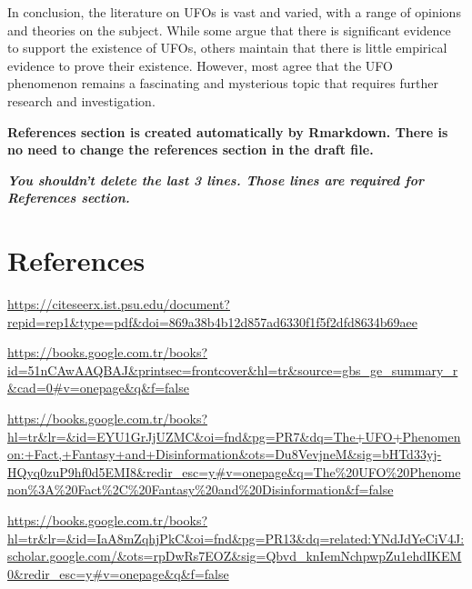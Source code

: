 \documentclass[
]{article}
\newlength{\cslhangindent}
\newlength{\cslentryspacingunit} %
\newenvironment{CSLReferences}[2] %
 {%
  \setlength{\parindent}{0pt}
  \ifodd #1
  \let\oldpar\par
  \def\par{\hangindent=\cslhangindent\oldpar}
  \fi
  \setlength{\parskip}{#2\cslentryspacingunit}
 }%
 {}
\begin{document}
In conclusion, the literature on UFOs is vast and varied, with a range of opinions and theories on the subject. While some argue that there is significant evidence to support the existence of UFOs, others maintain that there is little empirical evidence to prove their existence. However, most agree that the UFO phenomenon remains a fascinating and mysterious topic that requires further research and investigation.

\textbf{References section is created automatically by Rmarkdown. There is no need to change the references section in the draft file.}

\textbf{\emph{You shouldn't delete the last 3 lines. Those lines are required for References section.}}

\newpage

\hypertarget{references}{%
\section{References}\label{references}}

\hypertarget{refs}{}
\begin{CSLReferences}{0}{0}
\end{CSLReferences}

\url{https://citeseerx.ist.psu.edu/document?repid=rep1\&type=pdf\&doi=869a38b4b12d857ad6330f1f5f2dfd8634b69aee}

\url{https://books.google.com.tr/books?id=51nCAwAAQBAJ\&printsec=frontcover\&hl=tr\&source=gbs_ge_summary_r\&cad=0\#v=onepage\&q\&f=false}

\url{https://books.google.com.tr/books?hl=tr\&lr=\&id=EYU1GrJjUZMC\&oi=fnd\&pg=PR7\&dq=The+UFO+Phenomenon:+Fact,+Fantasy+and+Disinformation\&ots=Du8VevjneM\&sig=bHTd33yj-HQyq0zuP9hf0d5EMI8\&redir_esc=y\#v=onepage\&q=The\%20UFO\%20Phenomenon\%3A\%20Fact\%2C\%20Fantasy\%20and\%20Disinformation\&f=false}

\url{https://books.google.com.tr/books?hl=tr\&lr=\&id=IaA8mZqhjPkC\&oi=fnd\&pg=PR13\&dq=related:YNdJdYeCiV4J:scholar.google.com/\&ots=rpDwRs7EOZ\&sig=Qbvd_knIemNchpwpZu1ehdIKEM0\&redir_esc=y\#v=onepage\&q\&f=false}
\end{document}
